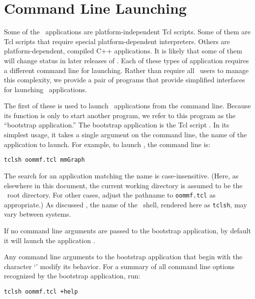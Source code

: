 
\section{Command Line Launching}\label{sec:cll}

Some of the \OOMMF\ applications are platform-independent Tcl
scripts.  Some of them are Tcl scripts that require special
platform-dependent interpreters.  Others are platform-dependent,
compiled C++ applications.  It is likely that some of them will 
change status in later releases of \OOMMF.  Each of these types
of application requires a different command line for launching.
Rather than require all \OOMMF\ users to manage this complexity,
we provide a pair of programs that provide simplified interfaces
for launching \OOMMF\ applications.

The first of these is used to launch \OOMMF\ applications from the
command line.  Because its function is only to start another
program, we refer to this program as the ``bootstrap application.''
The bootstrap application is the Tcl script .
In its simplest usage, it takes a single argument on the command line,
the name of the application to launch.  For example, to launch
,
the command line is:
\begin{verbatim}
tclsh oommf.tcl mmGraph
\end{verbatim}
The search for an application matching the name is case-insensitive.
(Here, as elsewhere in this document, the current working
directory is assumed to be the \OOMMF\ root
directory.  For other cases, adjust the pathname to {\tt oommf.tcl} as
appropriate.)  As discussed , the name of the \Tcl\ shell,
rendered here as \verb+tclsh+, may vary between systems.

If no command line arguments are passed to the bootstrap application,
by default it will launch the application
.

Any command line arguments to the bootstrap
application that begin with the character `\cd{+}' modify its
behavior.
For a summary of all command line options recognized by the bootstrap
application, run:
\begin{verbatim}
tclsh oommf.tcl +help
\end{verbatim}

